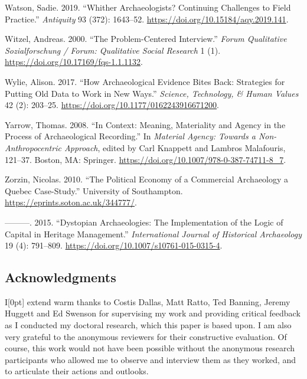 \documentclass[
]{article}
\newlength{\cslhangindent}
\newenvironment{CSLReferences}[2] %
 {\begin{list}{}{%
  \setlength{\itemindent}{0pt}
  \setlength{\leftmargin}{0pt}
  \setlength{\parsep}{0pt}
  \ifodd #1
   \setlength{\leftmargin}{\cslhangindent}
   \setlength{\itemindent}{-1\cslhangindent}
  \fi
  \setlength{\itemsep}{#2\baselineskip}}}
 {\end{list}}
\newcommand{\paragraphnumber}[1]{\marginnote{\color{lightgray}\tiny{#1}}[0pt]}
\begin{document}
\begin{CSLReferences}{1}{0}
Watson, Sadie. 2019. {``Whither Archaeologists? {Continuing} Challenges
to Field Practice.''} \emph{Antiquity} 93 (372): 1643--52.
\url{https://doi.org/10.15184/aqy.2019.141}.

Witzel, Andreas. 2000. {``The Problem-Centered Interview.''} \emph{Forum
Qualitative Sozialforschung / Forum: Qualitative Social Research} 1 (1).
\url{https://doi.org/10.17169/fqs-1.1.1132}.

Wylie, Alison. 2017. {``How {Archaeological Evidence Bites Back}:
{Strategies} for {Putting Old Data} to {Work} in {New Ways}.''}
\emph{Science, Technology, \& Human Values} 42 (2): 203--25.
\url{https://doi.org/10.1177/0162243916671200}.

Yarrow, Thomas. 2008. {``In {Context}: {Meaning}, {Materiality} and
{Agency} in the {Process} of {Archaeological Recording}.''} In
\emph{Material {Agency}: {Towards} a {Non-Anthropocentric Approach}},
edited by Carl Knappett and Lambros Malafouris, 121--37. Boston, MA:
Springer. \url{https://doi.org/10.1007/978-0-387-74711-8_7}.

Zorzin, Nicolas. 2010. {``The Political Economy of a Commercial
Archaeology a {Quebec} Case-Study.''} University of Southampton.
\url{https://eprints.soton.ac.uk/344777/}.

---------. 2015. {``Dystopian {Archaeologies}: {The Implementation} of
the {Logic} of {Capital} in {Heritage Management}.''}
\emph{International Journal of Historical Archaeology} 19 (4): 791--809.
\url{https://doi.org/10.1007/s10761-015-0315-4}.

\end{CSLReferences}

\newpage

\subsection{Acknowledgments}\label{acknowledgments}

I\paragraphnumber{[72]} extend warm thanks to Costis Dallas, Matt Ratto,
Ted Banning, Jeremy Huggett and Ed Swenson for supervising my work and
providing critical feedback as I conducted my doctoral research, which
this paper is based upon. I am also very grateful to the anonymous
reviewers for their constructive evaluation. Of course, this work would
not have been possible without the anonymous research participants who
allowed me to observe and interview them as they worked, and to
articulate their actions and outlooks.
\end{document}
